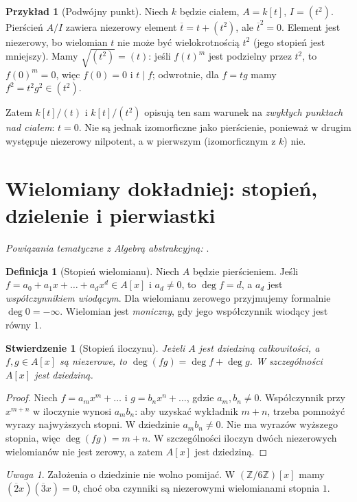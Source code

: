 \documentclass[11pt,a4paper,openany]{report}
\numberwithin{equation}{section}
\theoremstyle{plain}
\newtheorem{stwierdzenie}[twierdzenie]{Stwierdzenie}
\theoremstyle{definition}
\newtheorem{definicja}[twierdzenie]{Definicja}
\newtheorem{przyklad}[twierdzenie]{Przykład}
\theoremstyle{remark}
\newtheorem{uwaga}[twierdzenie]{Uwaga}
\newcommand{\Z}{\mathbb Z}
\begin{document}
\begin{przyklad}[Podwójny punkt]
Niech $k$ będzie ciałem, $A=k[t]$, $I=(t^2)$.
Pierścień $A/I$ zawiera niezerowy element $\overline t=t+(t^2)$,
ale $\overline t^2=0$. Element jest niezerowy,
bo wielomian $t$ nie może być wielokrotnością $t^2$
(jego stopień jest mniejszy).
Mamy $\sqrt{(t^2)}=(t)$: jeśli $f(t)^m$ jest podzielny przez $t^2$,
to $f(0)^m=0$, więc $f(0)=0$ i $t\mid f$;
odwrotnie, dla $f=tg$ mamy $f^2=t^2g^2\in(t^2)$.

Zatem $k[t]/(t)$ i $k[t]/(t^2)$ opisują ten sam warunek
na \emph{zwykłych punktach nad ciałem}: $t=0$.
Nie są jednak izomorficzne jako pierścienie, ponieważ w drugim
występuje niezerowy nilpotent, a w pierwszym (izomorficznym z $k$) nie.
\end{przyklad}

\section{Wielomiany dokładniej: stopień, dzielenie i pierwiastki}

\noindent\emph{Powiązania tematyczne z Algebrą abstrakcyjną:} .


\begin{definicja}[Stopień wielomianu]
Niech $A$ będzie pierścieniem. Jeśli
$f=a_0+a_1x+\dots+a_dx^d\in A[x]$ i $a_d\ne0$,
to $\deg f=d$, a $a_d$ jest \emph{współczynnikiem wiodącym}.
Dla wielomianu zerowego przyjmujemy formalnie $\deg0=-\infty$.
Wielomian jest \emph{moniczny}, gdy jego współczynnik wiodący jest równy $1$.
\end{definicja}

\begin{stwierdzenie}[Stopień iloczynu]
Jeżeli $A$ jest dziedziną całkowitości, a $f,g\in A[x]$ są niezerowe,
to $\deg(fg)=\deg f+\deg g$. W szczególności $A[x]$ jest dziedziną.
\end{stwierdzenie}
\begin{proof}
Niech $f=a_mx^m+\dots$ i $g=b_nx^n+\dots$, gdzie $a_m,b_n\ne0$.
Współczynnik przy $x^{m+n}$ w iloczynie wynosi $a_mb_n$:
aby uzyskać wykładnik $m+n$, trzeba pomnożyć wyrazy najwyższych stopni.
W dziedzinie $a_mb_n\ne0$. Nie ma wyrazów wyższego stopnia,
więc $\deg(fg)=m+n$. W szczególności iloczyn dwóch niezerowych
wielomianów nie jest zerowy, a zatem $A[x]$ jest dziedziną.
\end{proof}

\begin{uwaga}
Założenia o dziedzinie nie wolno pomijać. W $(\Z/6\Z)[x]$
mamy $(\overline2x)(\overline3x)=0$, choć oba czynniki są
niezerowymi wielomianami stopnia $1$.
\end{uwaga}
\end{document}
